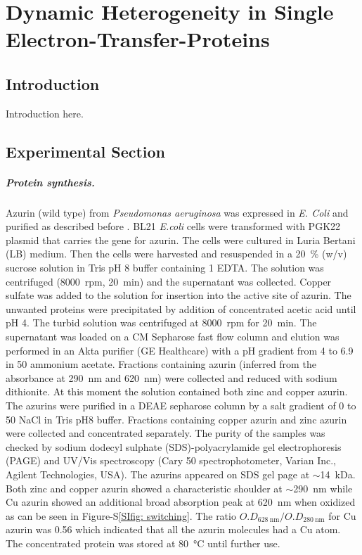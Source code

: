 \chapter{Dynamic Heterogeneity in Single Electron-Transfer-Proteins}
\label{chapter:azurin}
\graphicspath{{./chapters/c4_azurin_sm/main/}}
\section{Introduction}
Introduction here.
\section{Experimental Section}

\paragraph*{Protein synthesis.}
Azurin (wild type) from \textit{Pseudomonas aeruginosa} was expressed in \textit{E. Coli} and purified as described before \citep{kamp1990purification}.
BL21 \textit{E.coli} cells were transformed with PGK22 plasmid that carries the gene for azurin.
The cells were cultured in Luria Bertani (LB) medium.
Then the cells were harvested and resuspended in a \SI{20}{\percent} (w/v) sucrose solution in Tris pH 8 buffer containing \SI{1}{\mM} EDTA.
The solution was centrifuged (\SI{8000}{ rpm}, \SI{20}{\minute}) and the supernatant was collected.
Copper sulfate was added to the solution for insertion into the active site of azurin.
The unwanted proteins were precipitated by addition of concentrated acetic acid until pH 4. 
The turbid solution was centrifuged at \SI{8000}{ rpm} for \SI{20}{\minute}.
The supernatant was loaded on a CM Sepharose fast flow column and elution was performed in an Akta purifier (GE Healthcare) with a pH gradient from 4 to 6.9 in 
\SI{50}{\mM} ammonium acetate.
Fractions containing azurin (inferred from the absorbance at \SI{290}{\nm} and \SI{620}{\nm}) were collected and reduced with sodium dithionite.
At this moment the solution contained both zinc and copper azurin.
The azurins were purified in a DEAE sepharose column by a salt gradient of 0 to \SI{50}{\mM} NaCl in Tris pH8 buffer. 
Fractions containing copper azurin and zinc azurin were collected and concentrated separately.
The purity of the samples was checked by sodium dodecyl sulphate (SDS)-polyacrylamide gel electrophoresis (PAGE) and UV/Vis spectroscopy (Cary 50 spectrophotometer, Varian Inc., Agilent Technologies, USA).
The azurins appeared on SDS gel page at $\sim$\SI{14}{ kDa}.
Both zinc and copper azurin showed a characteristic shoulder at ${\sim}$\SI{290}{\nm} while Cu azurin showed an additional 
broad absorption peak at \SI{620}{\nm} when oxidized as can be seen in Figure-S\ref{SIfig: switching}. 
The ratio $O.D_{\SI{628}{\nm}}/O.D_{\SI{280}{\nm}}$ for Cu azurin was 0.56 which indicated that all the azurin molecules had a Cu atom. 
The concentrated protein was stored at \SI{80}{\celsius} until further use.

